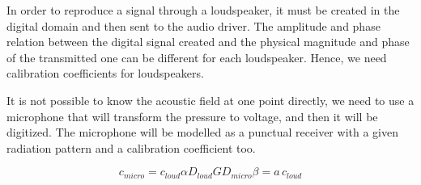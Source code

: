 In order to reproduce a signal through a loudspeaker, it must be created in the digital domain and then sent to the audio driver. The amplitude and phase relation between the digital signal created and the physical magnitude and phase of the transmitted one can be different for each loudspeaker. Hence, we need calibration coefficients for loudspeakers.

It is not possible to know the acoustic field at one point directly, we need to use a microphone that will transform the pressure to voltage, and then it will be digitized. The microphone will be modelled as a punctual receiver with a given radiation pattern and a calibration coefficient too.

%

\begin{equation}
c_\mathit{micro} = c_\mathit{loud} \alpha D_{loud} G D_{micro} \beta = a \, c_\mathit{loud}
\label{transEquationCalibration}
\end{equation}

